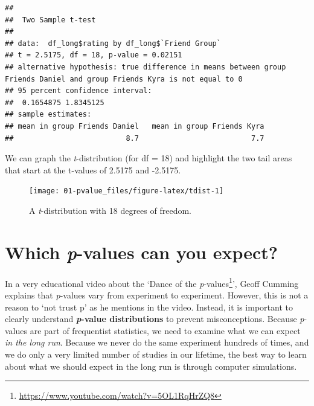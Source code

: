 \documentclass[
  oneside]{krantz}
\makeatletter
\newenvironment{Shaded}{\begin{snugshade}}{\end{snugshade}}
\newcommand{\AttributeTok}[1]{\textcolor[rgb]{0.61,0.61,0.61}{#1}}
\newcommand{\ConstantTok}[1]{\textcolor[rgb]{0,0,0}{#1}}
\newcommand{\FunctionTok}[1]{\textcolor[rgb]{0,0,0}{#1}}
\newcommand{\NormalTok}[1]{#1}
\newcommand{\SpecialCharTok}[1]{\textcolor[rgb]{0,0,0}{#1}}
\newcommand{\StringTok}[1]{\textcolor[rgb]{0.5,0.5,0.5}{#1}}
\renewcommand{\href}[2]{#2\footnote{\url{#1}}}
\newenvironment{kframe}{%
\medskip{}
\setlength{\fboxsep}{.8em}
 \def\at@end@of@kframe{}%
 \ifinner\ifhmode%
  \def\at@end@of@kframe{\end{minipage}}%
  \begin{minipage}{\columnwidth}%
 \fi\fi%
 \def\FrameCommand##1{\hskip\@totalleftmargin \hskip-\fboxsep
 \colorbox{shadecolor}{##1}\hskip-\fboxsep
     \hskip-\linewidth \hskip-\@totalleftmargin \hskip\columnwidth}%
 \MakeFramed {\advance\hsize-\width
   \@totalleftmargin\z@ \linewidth\hsize
   \@setminipage}}%
 {\par\unskip\endMakeFramed%
 \at@end@of@kframe}
\renewenvironment{Shaded}{\begin{kframe}}{\end{kframe}}
\makeatother
\begin{document}
\begin{Shaded}
\end{Shaded}

\begin{verbatim}
## 
##  Two Sample t-test
## 
## data:  df_long$rating by df_long$`Friend Group`
## t = 2.5175, df = 18, p-value = 0.02151
## alternative hypothesis: true difference in means between group Friends Daniel and group Friends Kyra is not equal to 0
## 95 percent confidence interval:
##  0.1654875 1.8345125
## sample estimates:
## mean in group Friends Daniel   mean in group Friends Kyra 
##                          8.7                          7.7
\end{verbatim}

We can graph the \emph{t}-distribution (for df = 18) and highlight the two tail areas that start at the t-values of 2.5175 and -2.5175.



\begin{figure}

{\centering \texttt{[image: 01-pvalue\_files/figure-latex/tdist-1]} 

}

\caption{A \emph{t}-distribution with 18 degrees of freedom.}\label{fig:tdist}
\end{figure}

\hypertarget{whichpexpect}{%
\section{\texorpdfstring{Which \emph{p}-values can you expect?}{Which p-values can you expect?}}\label{whichpexpect}}

In a very educational video about the `\href{https://www.youtube.com/watch?v=5OL1RqHrZQ8}{Dance of the \emph{p}-values}', Geoff Cumming explains that \emph{p}-values vary from experiment to experiment. However, this is not a reason to `not trust p' as he mentions in the video. Instead, it is important to clearly understand \textbf{\emph{p}-value distributions} to prevent misconceptions. Because \emph{p}-values are part of frequentist statistics, we need to examine what we can expect \emph{in the long run}. Because we never do the same experiment hundreds of times, and we do only a very limited number of studies in our lifetime, the best way to learn about what we should expect in the long run is through computer simulations.
\end{document}
